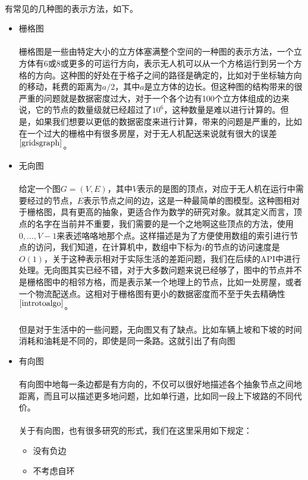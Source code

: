 \documentclass[UTF8,a4paper]{ctexart}
\begin{document}
\paragraph{}有常见的几种图的表示方法，如下。
\begin{itemize}
    \item 栅格图\label{grid}
          \paragraph{}
          栅格图是一些由特定大小的立方体塞满整个空间的一种图的表示方法，一个立方体有6或8或更多的可运行方向，表示无人机可以从一个方格运行到另一个方格的方向。这种图的好处在于格子之间的路径是确定的，比如对于坐标轴方向的移动，耗费的距离为$a/2$，其中$a$是立方体的边长。但这种图的结构带来的很严重的问题就是数据密度过大，对于一个各个边有100个立方体组成的边来说，它的节点的数量级就已经超过了$10^6$，这种数量是难以进行计算的。但是，如果我们想要以更低的数据密度来进行计算，带来的问题是严重的，比如在一个过大的栅格中有很多房屋，对于无人机配送来说就有很大的误差$^{\cite{gridsgraph}}$。
    \item 无向图
          \paragraph{}给定一个图$G=(V,E)$，其中$V$表示的是图的顶点，对应于无人机在运行中需要经过的节点，$E$表示节点之间的边，这是一种最简单的图模型。这种图相对于栅格图，具有更高的抽象，更适合作为数学的研究对象。就其定义而言，顶点的名字在当前并不重要，我们需要的是一个之地啊这些顶点的方法，使用$0,...,V-1$来表述咯咯地那个点。这样描述是为了方便使用数组的索引进行节点的访问，我们知道，在计算机中，数组中下标为$i$的节点的访问速度是$O(1)$，关于这种表示相对于实际生活的差距问题，我们在后续的API中进行处理。无向图其实已经不错，对于大多数问题来说已经够了，图中的节点并不是栅格图中的相邻方格，而是表示某一个地理上的节点，比如一处房屋，或者一个物流配送点。这相对于栅格图有更小的数据密度而不至于失去精确性$^{\cite{introtoalgo}}$。
          \paragraph{}
          但是对于生活中的一些问题，无向图又有了缺点。比如车辆上坡和下坡的时间消耗和油耗是不同的，即使是同一条路。这就引出了有向图
    \item 有向图
          \paragraph{}有向图中地每一条边都是有方向的，不仅可以很好地描述各个抽象节点之间地距离，而且可以描述更多地问题，比如单行道，比如同一段上下坡路的不同代价。
          \paragraph{}关于有向图，也有很多研究的形式，我们在这里采用如下规定：
          \begin{itemize}
              \item 没有负边
              \item 不考虑自环
          \end{itemize}
\end{itemize}
\end{document}
